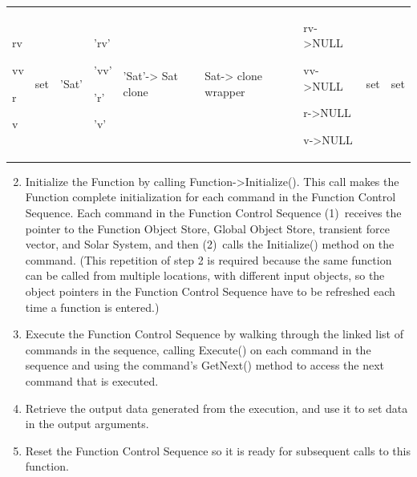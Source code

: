 \begin{center}
\begin{supertabular}{|p{0.5in}|p{0.5in}|p{0.4in}|p{0.4in}|p{0.5in}|p{0.68in}|p{0.67in}|p{0.5in}|
p{0.5in}|}
\begin{small}
rv

vv

r

v
\end{small} &
\begin{small}
set
\end{small} &
\begin{small}
'Sat'
\end{small} &
\begin{small}
'rv'

'vv'

'r'

'v'
\end{small} &
\begin{small}
'Sat'-> Sat clone
\end{small} &
\begin{small}
Sat-> clone wrapper
\end{small} &
\begin{small}
rv->NULL

vv->NULL

r->NULL

v->NULL
\end{small} &
\begin{small}
set
\end{small} &
\begin{small}
set
\end{small} \\
\end{supertabular}
\end{center}

\begin{enumerate}
\setcounter{enumi}{1}
\item Initialize the Function by calling Function-{\textgreater}Initialize().  This call makes the
Function complete initialization for each command in the Function Control Sequence.  Each command in
the Function Control Sequence (1)~receives the pointer to the Function Object Store, Global Object
Store, transient force vector, and Solar System, and then (2)~calls the Initialize() method on the
command.  (This repetition of step 2 is required because the same function can be called from
multiple locations, with different input objects, so the object pointers in the Function Control
Sequence have to be refreshed each time a function is entered.)
\item Execute the Function Control Sequence by walking through the linked list of commands in the
sequence, calling Execute() on each command in the sequence and using the command's GetNext() method
to access the next command that is executed.
\item Retrieve the output data generated from the execution, and use it to set data in the output
arguments.
\item Reset the Function Control Sequence so it is ready for subsequent calls to this function.
\end{enumerate}

